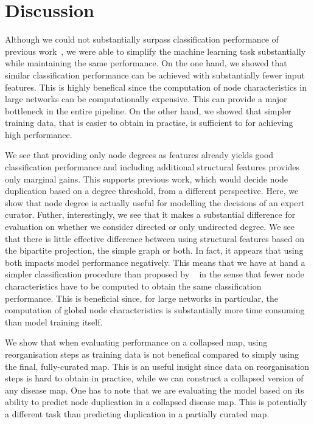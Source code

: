 \documentclass[
	fontsize=10pt, %
	twoside=true, %
	secnumdepth=1, %
  toc=indentunnumbered %
]{kaobook}
\begin{document}
\section{Discussion}
\label{sec:discussion}

Although we could not substantially surpass classification performance of
previous work~\cite{nielsen_MachineLearningSupport_2019}, we were able to
simplify the machine learning task substantially while maintaining the same
performance. On the one hand, we showed that similar classification performance
can be achieved with substantially fewer input features. This is highly
benefical since the computation of node characteristics in large networks can be
computationally expensive. This can provide a major bottleneck in the entire pipeline.
On the other hand, we showed that simpler training data, that is easier to
obtain in practise, is sufficient to for achieving high performance.

We see that providing only node degrees as features already yields
good classification performance and including additional structural features
provides only marginal gains. This supports previous work, which would decide
node duplication based on a degree threshold, from a different perspective. Here, we
show that node degree is actually useful for modelling the decisions of an
expert curator.
%
Futher, interestingly, we see that it makes a substantial difference for
evaluation on \ReconMap{} whether we consider directed or only undirected
degree.
%
We see that there is little effective difference between using structural
features based on the bipartite projection, the simple graph or both. In fact,
it appears that using both impacts model performance negatively. 
%
This means that we have at hand a simpler classification procedure than proposed
by \nielsen{}~\cite{nielsen_MachineLearningSupport_2019} in the sense that
fewer node characteristics have to be computed to obtain the same classification
performance. This is beneficial since, for large networks in particular, the
computation of global node characteristics is substantially more time consuming
than model training itself.

We show that when evaluating performance on a collapsed map, using
reorganisation steps as training data is not benefical compared to simply using
the final, fully-curated map. This is an useful insight since data on reorganisation
steps is hard to obtain in practice, while we can construct a collapsed
version of any disease map. One has to note that we are evaluating the
model based on its ability to predict node duplication in a collapsed disease
map. This is potentially a different task than predicting duplication in a
partially curated map.
\end{document}

